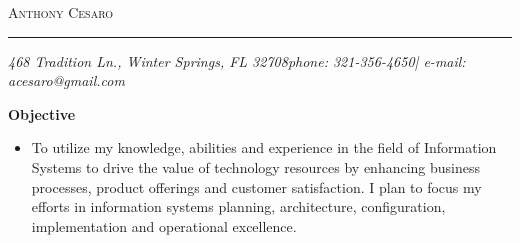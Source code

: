 \documentclass[10pt,oneside]{article}
\makeatletter
\newcommand{\name}{Anthony Cesaro}
\newcommand{\email}{acesaro@gmail.com}
\newcommand{\addr}{468 Tradition Ln., Winter Springs, FL 32708}
\newcommand{\phone}{321-356-4650}
\newcommand{\bigname}[1]{
	\begin{flushleft}\selectfont\Large\scshape#1\end{flushleft}
}
\newenvironment{ressection}[1]{
	\vspace{4pt}
	\textbf{\selectfont\normalsize#1}
	\begin{itemize}
	\vspace{3pt}
}{
	\end{itemize}
}
\newcommand{\resitem}[1]{
	\vspace{-4pt}
	\item \begin{flushleft} #1 \end{flushleft}
}
\makeatother
\begin{document}
 \selectfont

\bigname{\name}

\vspace{-8pt} \rule{\textwidth}{1pt}

\vspace{-1pt} {\small\itshape \addr \hfill phone: \phone | e-mail: \email}

\vspace{8 pt}


\begin{ressection}{Objective}

	\resitem{To utilize my knowledge, abilities and experience in the field of Information Systems to drive the value of technology resources by enhancing business processes, product offerings and customer satisfaction.  I plan to focus my efforts in information systems planning, architecture, configuration, implementation and operational excellence.}

\end{ressection}

\end{document}
